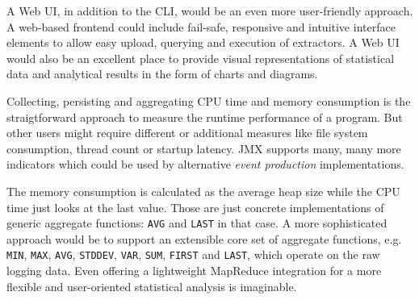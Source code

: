 A Web \gls{UI}, in addition to the \gls{CLI}, would be an even more user-friendly approach. A web-based frontend could include fail-safe, responsive and intuitive interface elements to allow easy upload, querying and execution of extractors. A Web \gls{UI} would also be an excellent place to provide visual representations of statistical data and analytical results in the form of charts and diagrams.

Collecting, persisting and aggregating CPU time and memory consumption is the straigtforward approach to measure the runtime performance of a program. But other users might require different or additional measures like file system consumption, thread count or startup latency. \gls{JMX} supports many, many more indicators which could be used by alternative \textit{event production} implementations.

The memory consumption is calculated as the average heap size while the CPU time just looks at the last value. Those are just concrete implementations of generic aggregate functions: \texttt{AVG} and \texttt{LAST} in that case. A more sophisticated approach would be to support an extensible core set of aggregate functions, e.g. \texttt{MIN}, \texttt{MAX}, \texttt{AVG}, \texttt{STDDEV}, \texttt{VAR}, \texttt{SUM}, \texttt{FIRST} and \texttt{LAST}, which operate on the raw logging data. Even offering a lightweight MapReduce integration for a more flexible and user-oriented statistical analysis is imaginable.